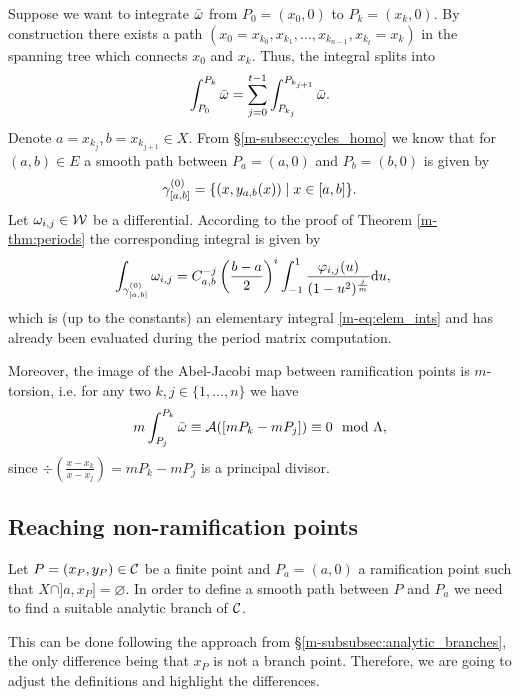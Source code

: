 \documentclass[main.tex]{subfiles}
\begin{document}
  Suppose we want to integrate $\bar{\omega}$ from $P_0 =(x_0,0)$ to $P_k = (x_k,0)$. By construction there exists a path
 $(x_0=x_{k_0},x_{k_1},\dots,x_{k_{n-1}},x_{k_t}=x_k)$ in the spanning tree which connects $x_0$ and $x_k$. Thus, the integral splits into
  \begin{align*}
    \int_{P_0}^{P_k} \bar{\omega} = \sum_{j = 0}^{t-1}  \int_{P_{k_j}}^{P_{k_{j+1}}} \bar{\omega}.
  \end{align*}
  Denote $a = x_{k_j}, b = x_{k_{j+1}} \in X$. From \S \ref{m-subsec:cycles_homo} we know that for $(a,b) \in E$ a smooth path between $P_a=(a,0)$ and $P_b=(b,0)$ is given by
  \begin{align*}
   \gamma_{[a,b]}^{(0)} = \{  (x,y_{a,b}(x))  \mid  x \in [a,b]  \}.
  \end{align*}
  Let $\omega_{i,j} \in \mathcal{W}$ be a differential. According to the proof of Theorem \ref{m-thm:periods} the corresponding integral is given by
  \begin{align*}
   \int_{\gamma_{[a,b]}^{(0)}} \omega_{i,j}  & = 
   C_{a,b}^{-j} \left(\frac{b-a}{2}\right)^i \int_{-1}^1 \frac{\varphi_{i,j}(u)}{(1-u^2)^{\frac{j}{m}}}  \mathrm d u,
  \end{align*}
  which is  (up to the constants) an elementary integral \ref{m-eq:elem_ints} and has already been evaluated during the period matrix computation.
  
  Moreover, the image of the Abel-Jacobi map between ramification points is $m$-torsion, i.e. for any two $k,j \in \{1,\dots,n\}$ we have
  \begin{equation}\label{eq:m_tors}
    m \int_{P_j}^{P_k} \bar{\omega} \equiv \mathcal{A}( [ mP_k - mP_j ] ) \equiv 0 \mod  \Lambda,
  \end{equation}
  since $\div\left( \frac{x-x_k}{x-x_j} \right) = mP_k - mP_j$ is a principal divisor.

  \subsection{Reaching non-ramification points}\label{subsec:ajm_finite}

  Let $P = (x_P,y_P) \in \mathcal{C}$ be a finite point and $P_a = (a,0)$ a ramification point such that $X\cap]a,x_P]=\varnothing$. In order to define a smooth path between $P$ and $P_a$ 
  we need to find a suitable analytic branch of $\mathcal{C}$. 
  
  This can be done following  the approach from \S \ref{m-subsubsec:analytic_branches}, the only difference being that
  $x_P$ is not a branch point. Therefore, we are going to adjust the definitions and highlight the differences.
  
\end{document}
